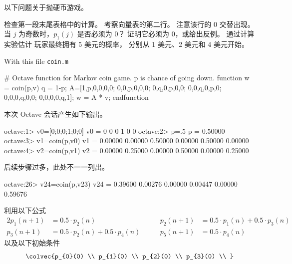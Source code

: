 \begin{exercises}
  \item 
    以下问题关于抛硬币游戏。
    \begin{exparts}
     \partsitem 检查第一段末尾表格中的计算。
     \partsitem 考察向量表的第二行。
       注意该行的 $0$ 交替出现。  
       当 $j$ 为奇数时，$p_1(j)$ 是否必须为 $0$？
       证明它必须为 $0$，或给出反例。
     \partsitem 通过计算实验估计
       玩家最终拥有 5 美元的概率，
       分别从 1 美元、2 美元和 4 美元开始。
    \end{exparts}
    \begin{answer}
      \begin{exparts}
        \partsitem With this file \texttt{coin.m}
\begin{computercode}         
# Octave function for Markov coin game.  p is chance of going down.
function w = coin(p,v)
  q = 1-p;
  A=[1,p,0,0,0,0;
     0,0,p,0,0,0;
     0,q,0,p,0,0;
     0,0,q,0,p,0;
     0,0,0,q,0,0;
     0,0,0,0,q,1];
  w = A * v;
endfunction
\end{computercode}
         本次 Octave 会话产生如下输出。 
\begin{computercode}
octave:1> v0=[0;0;0;1;0;0]
v0 =
  0
  0
  0
  1
  0
  0
octave:2> p=.5
p = 0.50000
octave:3> v1=coin(p,v0)
v1 =
  0.00000
  0.00000
  0.50000
  0.00000
  0.50000
  0.00000
octave:4> v2=coin(p,v1)
v2 =
  0.00000
  0.25000
  0.00000
  0.50000
  0.00000
  0.25000
\end{computercode}
后续步骤过多，此处不一一列出。
\begin{computercode}
octave:26> v24=coin(p,v23)
v24 =
  0.39600
  0.00276
  0.00000
  0.00447
  0.00000
  0.59676
\end{computercode}        
        \partsitem 利用以下公式
          \begin{alignat*}{2}
             p_{1}(n+1) &= 0.5\cdot p_{2}(n)
             &\qquad
             p_{2}(n+1) &= 0.5\cdot p_{1}(n)+0.5\cdot p_{3}(n)
                                                              \\
             p_{3}(n+1) &= 0.5\cdot p_{2}(n)+0.5\cdot p_{4}(n)
             &\qquad
             p_{5}(n+1) &= 0.5\cdot p_{4}(n)             
          \end{alignat*}
          以及以下初始条件
          \begin{equation*}
            \colvec{p_{0}(0) \\ p_{1}(0) \\ p_{2}(0) \\ p_{3}(0) \\ 
}
\end{equation*}
\end{exparts}
\end{answer}
\end{exercises}
